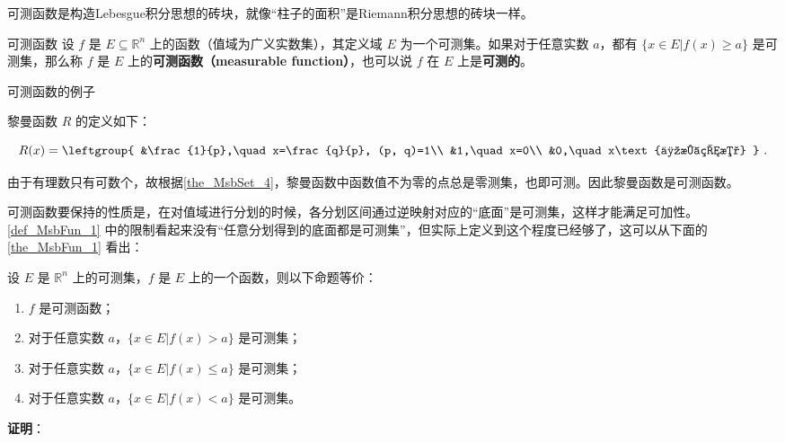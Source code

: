 可测函数是构造Lebesgue积分思想的砖块，就像“柱子的面积”是Riemann积分思想的砖块一样。

\begin{definition}{可测函数}\label{def_MsbFun_1}
设 $f$ 是 $E\subseteq\mathbb{R}^n$ 上的函数（值域为广义实数集），其定义域 $E$ 为一个可测集。如果对于任意实数 $a$，都有 $\{x\in E|f(x)\geq a\}$ 是可测集，那么称 $f$ 是 $E$ 上的\textbf{可测函数（measurable function）}，也可以说 $f$ 在 $E$ 上是\textbf{可测的}。
\end{definition}

\begin{example}{可测函数的例子}

黎曼函数 $R$ 的定义如下：

\begin{equation}
R(x)=
\leftgroup{
        &\frac{1}{p},\quad x=\frac{q}{p}, (p, q)=1\\
        &1,\quad x=0\\
        &0,\quad x\text{为无理数}
}~.
\end{equation}

由于有理数只有可数个，故根据\autoref{the_MsbSet_4}，黎曼函数中函数值不为零的点总是零测集，也即可测。因此黎曼函数是可测函数。

\end{example}









可测函数要保持的性质是，在对值域进行分划的时候，各分划区间通过逆映射对应的“底面”是可测集，这样才能满足可加性。\autoref{def_MsbFun_1} 中的限制看起来没有“任意分划得到的底面都是可测集”，但实际上定义到这个程度已经够了，这可以从下面的\autoref{the_MsbFun_1} 看出：


\begin{theorem}{}\label{the_MsbFun_1}
设 $E$ 是 $\mathbb{R}^n$ 上的可测集，$f$ 是 $E$ 上的一个函数，则以下命题等价：
\begin{enumerate}
\item $f$ 是可测函数；
\item 对于任意实数 $a$，$\{x\in E|f(x)>a\}$ 是可测集；
\item 对于任意实数 $a$，$\{x\in E|f(x)\leq a\}$ 是可测集；
\item 对于任意实数 $a$，$\{x\in E|f(x)<a\}$ 是可测集。
\end{enumerate}
\end{theorem}

\textbf{证明}：

